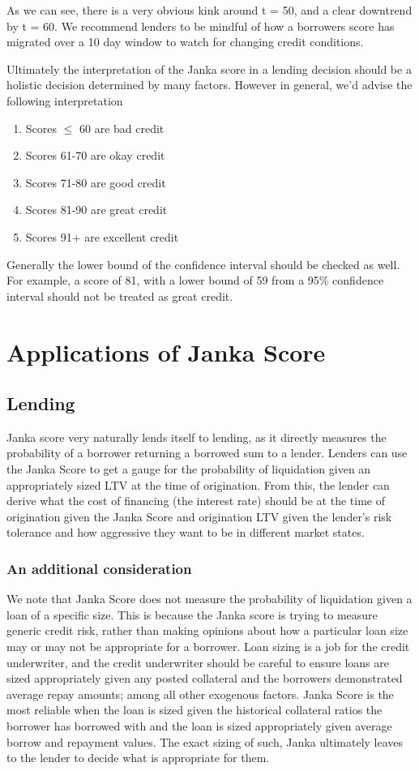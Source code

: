 \documentclass{article}
\begin{document}
As we can see, there is a very obvious kink around t = 50, and a clear downtrend by t = 60. We recommend lenders to be mindful of how a borrowers score has migrated over a 10 day window to watch for changing credit conditions. 

Ultimately the interpretation of the Janka score in a lending decision should be a holistic decision determined by many factors. However in general, we'd advise the following interpretation
\begin{enumerate}
    \item Scores $\leq$ 60 are bad credit
    \item Scores 61-70 are okay credit
    \item Scores 71-80 are good credit
    \item Scores 81-90 are great credit
    \item Scores 91+ are excellent credit
\end{enumerate}

Generally the lower bound of the confidence interval should be checked as well. For example, a score of 81, with a lower bound of 59 from a 95\% confidence interval should not be treated as great credit.
\section{Applications of Janka Score}
\subsection{Lending}
Janka score very naturally lends itself to lending, as it directly measures the probability of a borrower returning a borrowed sum to a lender. Lenders can use the Janka Score to get a gauge for the probability of liquidation given an appropriately sized LTV at the time of origination. From this, the lender can derive what the cost of financing (the interest rate) should be at the time of origination given the Janka Score and origination LTV given the lender's risk tolerance and how aggressive they want to be in different market states.
\subsubsection{An additional consideration}
We note that Janka Score does not measure the probability of liquidation given a loan of a specific size. This is because the Janka score is trying to measure generic credit risk, rather than making opinions about how a particular loan size may or may not be appropriate for a borrower. Loan sizing is a job for the credit underwriter, and the credit underwriter should be careful to ensure loans are sized appropriately given any posted collateral and the borrowers demonstrated average repay amounts; among all other exogenous factors. Janka Score is the most reliable when the loan is sized given the historical collateral ratios the borrower has borrowed with and the loan is sized appropriately given average borrow and repayment values. The exact sizing of such, Janka ultimately leaves to the lender to decide what is appropriate for them. 
\end{document}
